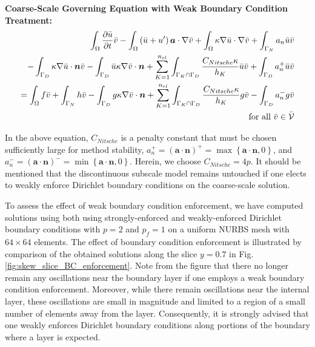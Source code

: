 \documentclass[11pt]{article}
\begin{document}
\noindent \textbf{Coarse-Scale Governing Equation with Weak Boundary Condition Treatment:}
\begin{equation}
\begin{aligned}
\int_\Omega \frac{\partial \bar{u}}{\partial t} \bar{v} -  \int_\Omega \left(\bar{u} + u'\right) \bm{a} \cdot \nabla \bar{v} +  \int_\Omega \kappa \nabla \bar{u} \cdot \nabla \bar{v} + \int_{\Gamma_N} a_n \bar{u} \bar{v} \\ 
- \int_{\Gamma_D} \kappa \nabla \bar{u} \cdot \bm{n} \bar{v} - \int_{\Gamma_D} \bar{u} \kappa \nabla \bar{v} \cdot \bm{n} + \sum_{K = 1}^{n_{el}} \int_{\Gamma_K \cap \Gamma_D} \frac{C_{Nitsche} \kappa}{h_K} \bar{u} \bar{v} + \int_{\Gamma_D} a^+_n \bar{u} \bar{v} \\
= \int_\Omega f \bar{v} + \int_{\Gamma_N} h \bar{v} - \int_{\Gamma_D} g \kappa \nabla \bar{v} \cdot \bm{n} + \sum_{K = 1}^{n_{el}} \int_{\Gamma_K \cap \Gamma_D} \frac{C_{Nitsche} \kappa}{h_K} g \bar{v} - \int_{\Gamma_D} a^-_n g \bar{v} \\
\textup{ for all } \bar{v} \in \bar{\mathcal{V}}
\end{aligned}
\end{equation}

\noindent In the above equation, $C_{Nitsche}$ is a penalty constant that must be chosen sufficiently large for method stability, $a^+_n = \left(\bm{a} \cdot \bm{n}\right)^+ = \max\left\{ \bm{a} \cdot \bm{n}, 0 \right\}$, and $a^-_n = \left(\bm{a} \cdot \bm{n}\right)^- = \min\left\{ \bm{a} \cdot \bm{n}, 0 \right\}$.  Herein, we choose $C_{Nitsche} = 4p$.  It should be mentioned that the discontinuous subscale model remains untouched if one elects to weakly enforce Dirichlet boundary conditions on the coarse-scale solution.

To assess the effect of weak boundary condition enforcement, we have computed solutions using both using strongly-enforced and weakly-enforced Dirichlet boundary conditions with $p = 2$ and $p_f = 1$  on a uniform NURBS mesh with $64 \times 64$ elements.  The effect of boundary condition enforcement is illustrated by comparison of the obtained solutions along the slice $y = 0.7$ in Fig. \ref{fig:skew_slice_BC_enforcement}.  Note from the figure that there no longer remain any oscillations near the boundary layer if one employs a weak boundary condition enforcement.  Moreover, while there remain oscillations near the internal layer, these oscillations are small in magnitude and limited to a region of a small number of elements away from the layer.  Consequently, it is strongly advised that one weakly enforces Dirichlet boundary conditions along portions of the boundary where a layer is expected.
\end{document}
